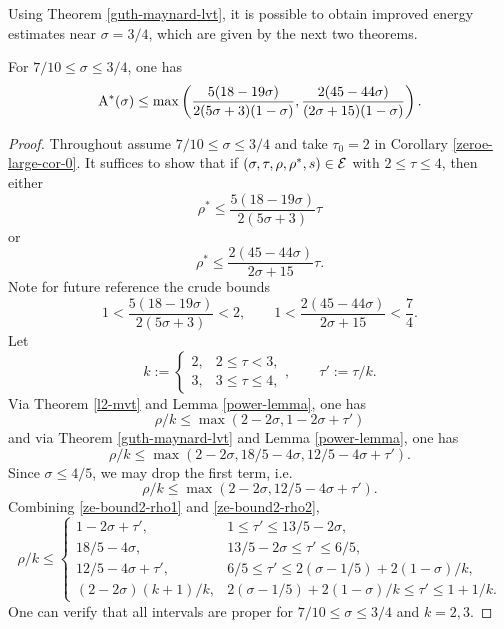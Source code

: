 Using Theorem \ref{guth-maynard-lvt}, it is possible to obtain improved energy estimates near $\sigma = 3/4$, which are given by the next two theorems.

\begin{theorem}\label{imp-energy-bound2}
For $7/10 \le \sigma \le 3/4$, one has
\[
\mathrm{A}^*(\sigma) \le \max\left(\frac{5(18 - 19\sigma)}{2(5\sigma + 3)(1 - \sigma)}, \frac{2(45 - 44\sigma)}{(2\sigma + 15)(1
- \sigma)}\right).
\]
\end{theorem}

\derived
{}

\begin{proof}

Throughout assume $7/10 \le \sigma \le 3/4$ and take $\tau_0 = 2$ in Corollary \ref{zeroe-large-cor-0}. It suffices to show that if $(\sigma, \tau, \rho, \rho^*, s) \in \mathcal{E}$ with $2 \le \tau \le 4$, then either
\begin{equation}
\rho^* \le \frac{5(18 - 19\sigma)}{2(5\sigma + 3)}\tau
\end{equation}
or
\begin{equation}
\rho^* \le \frac{2(45 - 44\sigma)}{2\sigma + 15}\tau.
\end{equation}
Note for future reference the crude bounds
\begin{equation}\label{ze-bound2-tau-factor-bounds}
1 < \frac{5(18 - 19\sigma)}{2(5\sigma + 3)} < 2,\qquad 1 < \frac{2(45 - 44\sigma)}{2\sigma + 15} < \frac{7}{4}.
\end{equation}
Let
\[
k := \begin{cases}
2,& 2 \le \tau < 3,\\
3,& 3 \le \tau \le 4,
\end{cases},\qquad \tau' := \tau/k.
\]
Via Theorem \ref{l2-mvt} and Lemma \ref{power-lemma}, one has
\begin{equation}\label{ze-bound2-rho1}
\rho/k \le \max(2 - 2\sigma, 1 - 2\sigma + \tau')
\end{equation}
and via Theorem \ref{guth-maynard-lvt} and Lemma \ref{power-lemma}, one has
\[
\rho/k\le \max(2 - 2\sigma, 18/5 - 4\sigma, 12/5 - 4\sigma + \tau').
\]
Since $\sigma \le 4/5$, we may drop the first term, i.e.
\begin{equation}\label{ze-bound2-rho2}
\rho/k \le \max(2 - 2\sigma, 12/5 - 4\sigma + \tau').
\end{equation}
Combining \eqref{ze-bound2-rho1} and \eqref{ze-bound2-rho2},
\begin{equation}\label{ze-bound2-rhok-bound}
\rho/k \le \begin{cases}
1 - 2\sigma + \tau',&1 \le \tau' \le 13/5 - 2\sigma,\\
18/5 - 4\sigma,& 13/5 - 2\sigma \le \tau' \le 6/5,\\
12/5 - 4\sigma + \tau',& 6/5 \le \tau' \le 2(\sigma - 1/5) + 2(1 - \sigma)/k,\\
(2 - 2\sigma)(k + 1)/k,& 2(\sigma - 1/5) + 2(1 - \sigma)/k \le \tau' \le 1 + 1/k.
\end{cases}
\end{equation}
One can verify that all intervals are proper for $7/10 \le \sigma \le 3/4$ and $k = 2,3$.


\end{proof}
